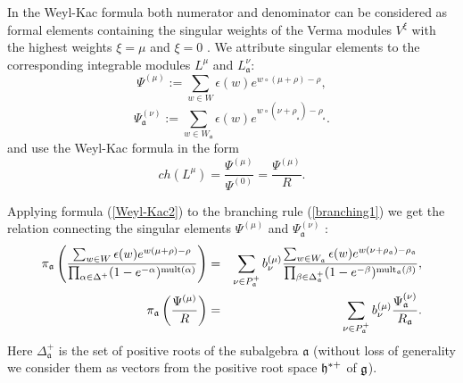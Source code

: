 \documentclass[12pt]{iopart}
\theoremstyle{definition}
\newcommand{\af}{\mathfrak{a}}
\begin{document}
In the Weyl-Kac formula both numerator and denominator  can be considered
as formal elements containing the singular weights of the Verma modules $V^{\xi}$
with the highest weights $\xi=\mu$ and $\xi=0$ \cite{humphreys1997introduction}.
We attribute singular elements to the corresponding integrable modules $L^{\mu }$
and $L_{\af}^{\nu }$:
\begin{equation*}
\Psi ^{\left( \mu \right) }:=\sum\limits_{w\in W}\epsilon (w)e^{w\circ (\mu +\rho )-\rho },
\end{equation*}
\begin{equation*}
\Psi _{ \af}^{\left( \nu \right) }:=
\sum\limits_{w\in W_{\af}}\epsilon (w)e^{w\circ (\nu +\rho
_{_{\af}})-\rho _{_{\af}}}.
\end{equation*}
and use the Weyl-Kac formula in the form
\begin{equation}
\label{Weyl-Kac2}
ch\left( L^{\mu }\right) =\frac{\Psi ^{\left( \mu \right) }}
{\Psi ^{\left( 0 \right) }}=\frac{\Psi ^{\left( \mu \right) }}{R}.
\end{equation}

Applying formula (\ref{Weyl-Kac2}) to the branching rule (\ref{branching1})
we get the relation connecting the
singular elements $\Psi ^{\left( \mu \right) }$ and $\Psi _{ \af}^{\left( \nu \right) }$ :
\begin{eqnarray}
\nonumber
\pi _{\af}\left( \frac{\sum_{w \in W}\epsilon (w )e^{w
(\mu +\rho )-\rho }}{\prod_{\alpha \in \Delta ^{+}}(1-e^{-\alpha })^{\mathrm{%
mult}(\alpha )}}\right) &=&\sum_{\nu \in P_{\af}^{+}}b_{\nu }^{(\mu )}%
\frac{\sum_{w \in W_{\af}}\epsilon (w )e^{w (\nu +\rho _{%
\af})-\rho _{\af}}}{\prod_{\beta \in \Delta _{\af%
}^{+}}(1-e^{-\beta })^{\mathrm{mult}_{\af}(\beta )}},  \label{eq:4} \\
\pi _{\af}\left( \frac{\Psi ^{\left( \mu \right) }}{R}\right)
&=&\sum_{\nu \in P_{\af}^{+}}b_{\nu }^{(\mu )}\frac{\Psi _{ \frak{%
a}}^{\left( \nu \right) }}{R_{\af}}.
\end{eqnarray}
Here $\Delta _{\af}^{+}$ is the set of
positive roots of the subalgebra $\af$ (without loss of generality we consider
them as vectors from the positive root space $\frak{h}^{\ast  +}$ of $\frak{g}$).
\end{document}

